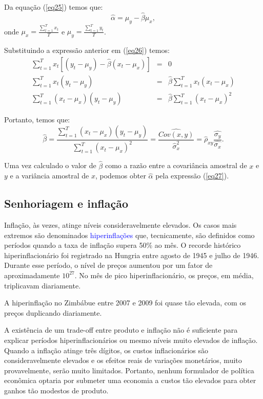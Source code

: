 \documentclass[preprintnumbers,nofootinbib,amsmath,amssymb,12pt]{article}
\begin{document}
    Da equação (\ref{eq25}) temos que:
    \begin{equation}
    \hat{\alpha} = \mu_y - \hat{\beta}\mu_x,
    \label{eq27}
    \end{equation}
    onde $\mu_x = \frac{\sum_{t=1}^T x_t}{T}$ e $\mu_y = \frac{\sum_{t=1}^T y_t}{T}$.
    
    Substituindo a expressão anterior em (\ref{eq26}) temos:
    \begin{eqnarray*}
    \sum_{t=1}^T x_t[(y_t - \mu_y) - \hat{\beta}(x_t - \mu_x)] &=& 0 \\
    \sum_{t=1}^T x_t(y_t - \mu_y) &=& \hat{\beta}\sum_{t=1}^T x_t(x_t - \mu_x) \\
    \sum_{t=1}^T (x_t - \mu_x)(y_t - \mu_y) &=& \hat{\beta}\sum_{t=1}^T (x_t - \mu_x)^2
    \end{eqnarray*}
    
    Portanto, temos que:
    \begin{equation}
        \hat{\beta} = \frac{\sum_{t=1}^T (x_t - \mu_x)(y_t - \mu_y)}{\sum_{t=1}^T (x_t - \mu_x)^2} = \frac{\widehat{Cov(x, y)}}{\hat{\sigma}_x^2} = \hat{\rho}_{xy}\frac{\hat{\sigma_y}}{\hat{\sigma_x}}.
        \label{eq28}
    \end{equation}
    
    Uma vez calculado o valor de $\hat{\beta}$ como a razão entre a covariância amostral de $x$ e $y$ e a variância amostral de $x$, podemos obter $\hat{\alpha}$ pela expressão (\ref{eq27}).
\newpage    
\subsection{Senhoriagem e inflação}
Inflação, às vezes, atinge níveis consideravelmente elevados. Os casos mais extremos são denominados \textcolor{blue}{hiperinflações} que, tecnicamente, são definidos como períodos quando a taxa de inflação supera 50\% ao mês. O recorde histórico hiperinflacionário foi registrado na Hungria entre agosto de 1945 e julho de 1946. Durante esse período, o nível de preços aumentou por um fator de aproximadamente $10^{27}$. No mês de pico hiperinflacionário, os preços, em média, triplicavam diariamente.

A hiperinflação no Zimbábue entre 2007 e 2009 foi quase tão elevada, com os preços duplicando diariamente.

A existência de um trade-off entre produto e inflação não é suficiente para explicar períodos hiperinflacionários ou mesmo níveis muito elevados de inflação. Quando a inflação atinge três dígitos, os custos inflacionários são consideravelmente elevados e os efeitos reais de variações monetários, muito provavelmente, serão muito limitados. Portanto, nenhum formulador de política econômica optaria por submeter uma economia a custos tão elevados para obter ganhos tão modestos de produto.
\end{document}
